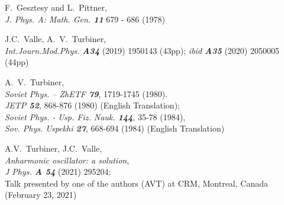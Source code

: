 \documentclass[preprint,preprintnumbers,amsmath,amssymb]{revtex4}
\begin{document}
\begin{thebibliography}{99}
           F.~Gesztesy and L.~Pittner,\\
           {\it J. Phys. A: Math. Gen. \bf 11} 679 - 686 (1978)

          J.C.~Valle, A.~V.~Turbiner,\\
          {\it Int.Journ.Mod.Phys. \bf A34} (2019) 1950143 (43pp);
          {\it ibid \bf A35} (2020) 2050005 (44pp)

          A.~V.~Turbiner,\\
           {\it Soviet Phys. -- ZhETF \bf 79}, 1719-1745 (1980).\\
           {\it JETP \bf 52}, 868-876 (1980)
           (English Translation);\\
          {\it Soviet Phys. - Usp. Fiz. Nauk. \bf 144}, 35-78 (1984),\\
          {\it Sov. Phys. Uspekhi \bf 27}, 668-694 (1984) (English Translation)

          A.V.~Turbiner, J.C.~Valle,\\
          \textit{Anharmonic oscillator: a solution},\\
          {\it J Phys. \bf A 54} (2021) 295204;\\
          Talk presented by one of the authors (AVT) at CRM, Montreal, Canada
          (February 23, 2021)

\end{thebibliography}
\end{document}
